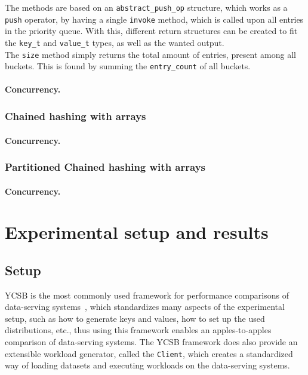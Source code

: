 \documentclass[11pt]{article} %
\begin{document}
The methods are based on an \verb|abstract_push_op| structure, which works as a \verb|push| operator, by having a single \verb|invoke| method, which is called upon all entries in the priority queue. With this, different return structures can be created to fit the \verb|key_t| and \verb|value_t| types, as well as the wanted output.\\

The \verb|size| method simply returns the total amount of entries, present among all buckets. This is found by summing the \verb|entry_count| of all buckets.

\paragraph{Concurrency.}

\subsubsection{Chained hashing with arrays}

\paragraph{Concurrency.}

\subsubsection{Partitioned Chained hashing with arrays}

\paragraph{Concurrency.}
\newpage

\section{Experimental setup and results}
\subsection{Setup}
YCSB is the most commonly used framework for performance comparisons of data-serving systems~\cite{BC10}, which standardizes many aspects of the experimental setup, such as how to generate keys and values, how to set up the used distributions, etc., thus using this framework enables an apples-to-apples comparison of data-serving systems. The YCSB framework does also provide an extensible workload generator, called the \verb|Client|, which creates a standardized way of loading datasets and executing workloads on the data-serving systems. 
\end{document}
